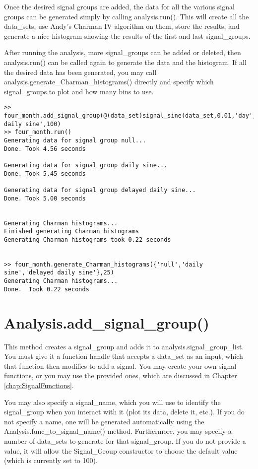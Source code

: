 \documentclass[12pt]{report}
\begin{document}
Once the desired signal groups are added, the data for all the various signal groups can be generated simply by calling analysis.run().  This will create all the data\_sets, use Andy's Charman IV algorithm on them, store the results, and generate a nice histogram showing the results of the first and last signal\_groups.

After running the analysis, more signal\_groups can be added or deleted, then analysis.run() can be called again to generate the data and the histogram.  If all the desired data has been generated, you may call analysis.generate\_Charman\_histograms() directly and specify which signal\_groups to plot and how many bins to use.

\begin{verbatim}
>> four_month.add_signal_group(@(data_set)signal_sine(data_set,0.01,'day',pi/8),'delayed daily sine',100)
>> four_month.run()
Generating data for signal group null...
Done. Took 4.56 seconds

Generating data for signal group daily sine...
Done. Took 5.45 seconds

Generating data for signal group delayed daily sine...
Done. Took 5.00 seconds


Generating Charman histograms...
Finished generating Charman histograms
Generating Charman histograms took 0.22 seconds


>> four_month.generate_Charman_histograms({'null','daily sine','delayed daily sine'},25)
Generating Charman histograms...
Done.  Took 0.22 seconds
\end{verbatim}

\section{Analysis.add\_signal\_group()}
This method creates a signal\_group and adds it to analysis.signal\_group\_list.  You must give it a function handle that accepts a data\_set as an input, which that function then modifies to add a signal.  You may create your own signal functions, or you may use the provided ones, which are discussed in Chapter \ref{chap:SignalFunctions}.

You may also specify a signal\_name, which you will use to identify the signal\_group when you interact with it (plot its data, delete it, etc.).  If you do not specify a name, one will be generated automatically using the Analysis.func\_to\_signal\_name() method.  Furthermore, you may specify a number of data\_sets to generate for that signal\_group.  If you do not provide a value, it will allow the Signal\_Group constructor to choose the default value (which is currently set to 100).
\end{document}
